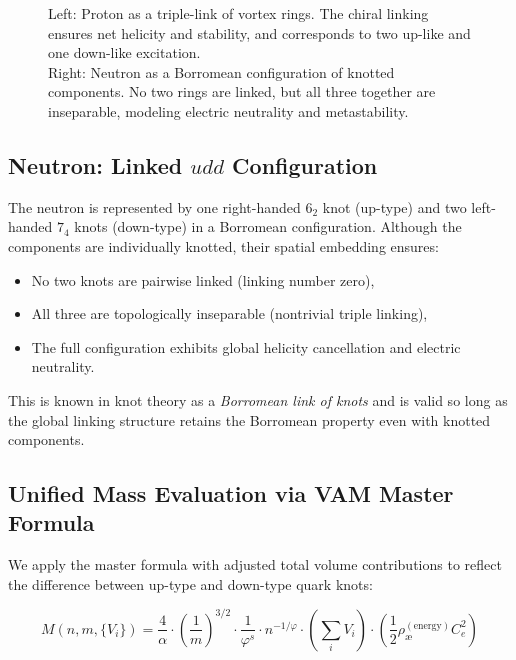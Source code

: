 \documentclass[12pt]{article}
\begin{document}
\begin{figure}[H]
\begin{minipage}{0.25\textwidth}
\end{minipage}
    \caption{Left: Proton as a triple-link of vortex rings. The chiral linking ensures net helicity and stability, and corresponds to two up-like and one down-like excitation.\\
      Right: Neutron as a Borromean configuration of knotted components. No two rings are linked, but all three together are inseparable, modeling electric neutrality and metastability.}
\end{figure}

\subsection{Neutron: Linked \(udd\) Configuration}

The neutron is represented by one right-handed \( 6_2 \) knot (up-type) and two left-handed \( 7_4 \) knots (down-type) in a Borromean configuration. Although the components are individually knotted, their spatial embedding ensures:

\begin{itemize}
    \item No two knots are pairwise linked (linking number zero),
    \item All three are topologically inseparable (nontrivial triple linking),
    \item The full configuration exhibits global helicity cancellation and electric neutrality.
\end{itemize}

This is known in knot theory as a \emph{Borromean link of knots} and is valid so long as the global linking structure retains the Borromean property even with knotted components.

\subsection{Unified Mass Evaluation via VAM Master Formula}

We apply the master formula with adjusted total volume contributions to reflect the difference between up-type and down-type quark knots:

\begin{equation}
\boxed{
M(n, m, \{V_i\}) = \frac{4}{\alpha} \cdot \left( \frac{1}{m} \right)^{3/2}
\cdot \frac{1}{\varphi^s} \cdot n^{-1/\varphi}
\cdot \left( \sum_i V_i \right)
\cdot \left( \frac{1}{2} \rho_\text{\ae}^{(\text{energy})} C_e^2 \right)
}
\end{equation}
\end{document}
